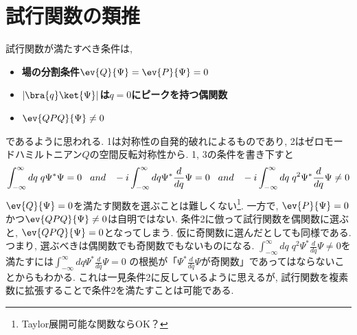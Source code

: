 \documentclass[10.5pt,a4paper]{jreport}
\begin{document}
\section{試行関数の類推}
試行関数が満たすべき条件は,
\begin{itemize}
\item[1.] \textbf{場の分割条件$\ev{Q}{\Psi} = \ev{P}{\Psi} = 0$}
\item[2.] \textbf{$|\bra{q}\ket{\Psi}|$は$q=0$にピークを持つ偶関数}
\item[3.] \textbf{$\ev{QPQ}{\Psi}\neq 0$}
\end{itemize}
であるように思われる. 1は対称性の自発的破れによるものであり, 2はゼロモードハミルトニアン$Q$の空間反転対称性から. 1, 3の条件を書き下すと
\begin{eqnarray}
  \int_{-\infty}^{\infty} dq\; q\Psi^*\Psi = 0 \hspace{0.3cm} and \hspace{0.3cm} -i\int_{-\infty}^{\infty} dq \Psi^*\frac{d}{dq}\Psi = 0 \hspace{0.3cm} and \hspace{0.3cm} -i\int_{-\infty}^{\infty} dq\; q^2 \Psi^*\frac{d}{dq}\Psi \neq 0
\end{eqnarray}
$\ev{Q}{\Psi} = 0$を満たす関数を選ぶことは難しくない\footnote{Taylor展開可能な関数ならOK？}. 一方で, $\ev{P}{\Psi} = 0$かつ$\ev{QPQ}{\Psi}\neq 0$は自明ではない. 条件2に倣って試行関数を偶関数に選ぶと, $\ev{QPQ}{\Psi} = 0$となってしまう. 仮に奇関数に選んだとしても同様である. つまり, 選ぶべきは偶関数でも奇関数でもないものになる. $\int_{-\infty}^{\infty} dq\; q^2 \Psi^*\frac{d}{dq}\Psi \neq 0$を満たすには$\int_{-\infty}^{\infty} dq \Psi^*\frac{d}{dq}\Psi = 0$ の根拠が「$\Psi^*\frac{d}{dq}\Psi$が奇関数」であってはならないことからもわかる. これは一見条件2に反しているように思えるが, 試行関数を複素数に拡張することで条件2を満たすことは可能である.
\end{document}

